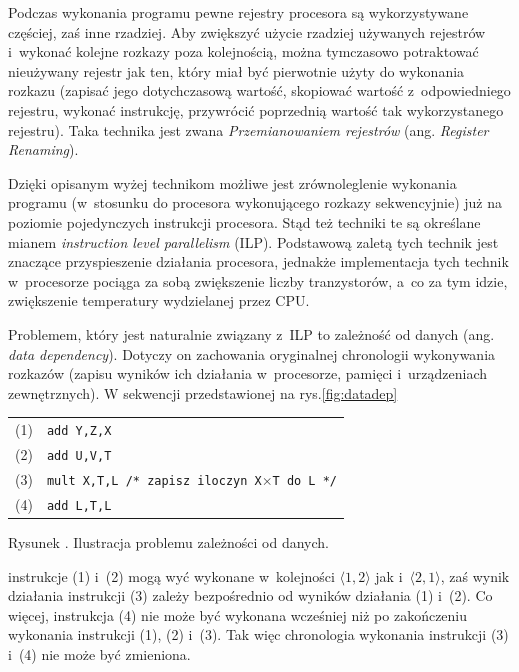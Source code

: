 \documentclass[12pt]{mwart}
\newcounter{figmain}
\newcommand{\myfigcounter}[1]{ \begin{center}Rysunek \arabic{figmain}. #1.\end{center} \addtocounter{figmain}{1} }
\begin{document}
\par
%
\indent
	Podczas wykonania programu pewne rejestry procesora są wykorzystywane częściej, zaś inne rzadziej. Aby zwiększyć użycie rzadziej
	używanych rejestrów i~wykonać kolejne rozkazy poza kolejnością, można tymczasowo potraktować nieużywany rejestr jak ten, który miał
	być pierwotnie użyty do wykonania rozkazu (zapisać jego dotychczasową wartość, skopiować wartość z~odpowiedniego rejestru, wykonać instrukcję,
	przywrócić poprzednią wartość tak wykorzystanego rejestru). Taka technika jest zwana 
	\emph{Przemianowaniem rejestrów} (ang. \emph{Register Renaming}).
\par
%
\indent
	Dzięki opisanym wyżej technikom możliwe jest zrównoleglenie wykonania programu (w~stosunku do procesora wykonującego rozkazy sekwencyjnie)
	już na poziomie pojedynczych instrukcji procesora. Stąd też techniki te są określane mianem \emph{instruction level parallelism} (ILP).
	Podstawową zaletą tych technik jest znaczące przyspieszenie działania procesora, jednakże implementacja tych technik w~procesorze pociąga za
	sobą zwiększenie liczby tranzystorów, a~co za tym idzie, zwiększenie temperatury wydzielanej przez CPU.
\par
%
\indent
	Problemem, który jest naturalnie związany z~ILP to zależność od danych (ang. \emph{data dependency}).
	Dotyczy on zachowania oryginalnej chronologii wykonywania rozkazów (zapisu wyników
	ich działania w~procesorze, pamięci i~urządzeniach zewnętrznych). W sekwencji przedstawionej na rys.\ref{fig:datadep}
	\begin{center}
	\begin{tabular}{l l}\\
		(1) & {\tt add Y,Z,X} \\
		(2) & {\tt add U,V,T} \\
		(3) & {\tt mult X,T,L /* zapisz iloczyn X}$\times${\tt T do L */} \\
		(4) & {\tt add L,T,L} \\
	\end{tabular}
	\myfigcounter{Ilustracja problemu zależności od danych}
	\label{fig:datadep}
	\end{center}
	instrukcje (1) i~(2) mogą wyć wykonane w~kolejności $\langle 1,2 \rangle$ jak i~$\langle 2,1 \rangle$, zaś wynik działania instrukcji
	(3) zależy bezpośrednio od wyników działania (1) i~(2). Co więcej, instrukcja (4) nie może być wykonana wcześniej 
	niż po zakończeniu wykonania instrukcji (1), (2) i~(3). Tak więc chronologia wykonania instrukcji (3) i~(4) nie może być zmieniona.
\par
\end{document}
